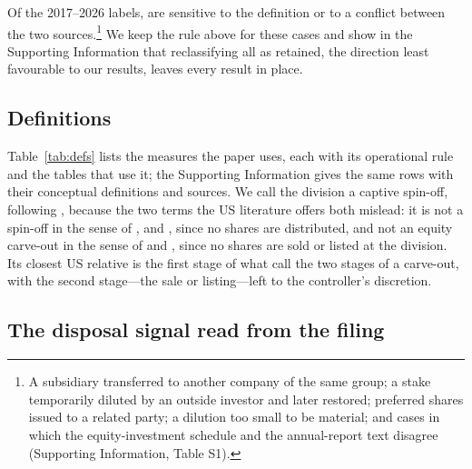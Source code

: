 Of the 2017--2026 labels, \NSensitive{} are sensitive to the definition or to a conflict between the two sources.\footnote{A subsidiary transferred to another company of the same group; a stake temporarily diluted by an outside investor and later restored; preferred shares issued to a related party; a dilution too small to be material; and cases in which the equity-investment schedule and the annual-report text disagree (Supporting Information, Table S1).} We keep the rule above for these cases and show in the Supporting Information that reclassifying all \NSensitive{} as retained, the direction least favourable to our results, leaves every result in place.

\subsection{Definitions}\label{sec:definitions}

Table~\ref{tab:defs} lists the \NDefs{} measures the paper uses, each with its operational rule and the tables that use it; the Supporting Information gives the same rows with their conceptual definitions and sources. We call the division a captive spin-off, following , because the two terms the US literature offers both mislead: it is not a spin-off in the sense of ,  and , since no shares are distributed, and not an equity carve-out in the sense of  and , since no shares are sold or listed at the division. Its closest US relative is the first stage of what  call the two stages of a carve-out, with the second stage---the sale or listing---left to the controller's discretion.

\begin{table}[htbp]
\centering
\caption{Definitions of the measures used in this paper (short form)}\label{tab:defs}
{\footnotesize\setlength{\tabcolsep}{3pt}}
\end{table}

\subsection{The disposal signal read from the filing}\label{sec:signal}

